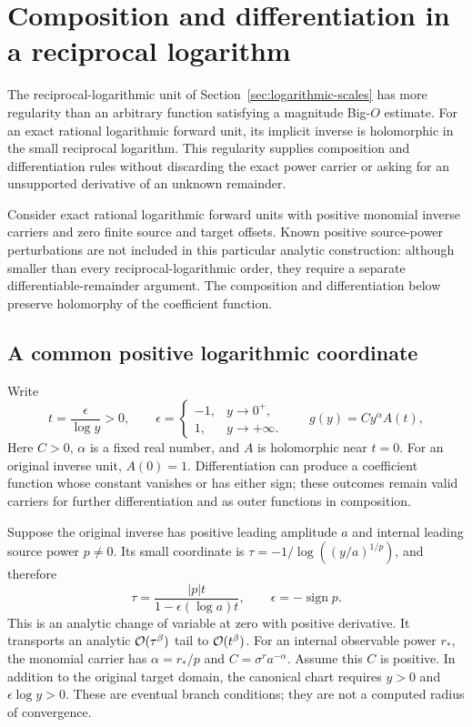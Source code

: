 \section{Composition and differentiation in a reciprocal logarithm}
\label{sec:reciprocal-log-operations}

The reciprocal-logarithmic unit of Section~\ref{sec:logarithmic-scales}
has more regularity than an arbitrary function satisfying a magnitude
Big-$O$ estimate. For an exact rational logarithmic forward unit, its
implicit inverse is holomorphic in the small reciprocal logarithm. This
regularity supplies composition and differentiation rules without
discarding the exact power carrier or asking for an unsupported derivative
of an unknown remainder.

Consider exact rational logarithmic forward units with positive monomial
inverse carriers and zero finite source and target offsets. Known positive
source-power perturbations are not included in this particular analytic
construction: although smaller than every reciprocal-logarithmic order,
they require a separate differentiable-remainder argument. The composition
and differentiation below preserve holomorphy of the coefficient function.

\subsection{A common positive logarithmic coordinate}

Write
\begin{equation}
 t=\frac{\epsilon}{\log y}>0,\qquad
 \epsilon=\begin{cases}-1,&y\to0^+,\\1,&y\to+\infty.\end{cases}
 \qquad g(y)=C y^\alpha A(t),
 \label{eq:reciprocal-calculus-carrier}
\end{equation}
Here $C>0$, $\alpha$ is a fixed real number, and $A$ is holomorphic
near $t=0$. For an original inverse unit, $A(0)=1$. Differentiation can
produce a coefficient function whose constant vanishes or has either sign;
these outcomes remain valid carriers for further differentiation and as
outer functions in composition.

Suppose the original inverse has positive leading amplitude $a$ and
internal leading source power $p\ne0$. Its small coordinate is
$\tau=-1/\log((y/a)^{1/p})$, and therefore
\begin{equation}
 \tau=\frac{|p|t}{1-\epsilon(\log a)t},\qquad
 \epsilon=-\operatorname{sign}p.
 \label{eq:reciprocal-calculus-rechart}
\end{equation}
This is an analytic change of variable at zero with positive derivative.
It transports an analytic $\mathcal O(\tau^\beta)$ tail to
$\mathcal O(t^\beta)$. For an internal observable power $r_*$, the monomial
carrier has $\alpha=r_*/p$ and $C=\sigma^r a^{-\alpha}$.
Assume this $C$ is positive. In addition to the
original target domain, the canonical chart requires $y>0$ and
$\epsilon\log y>0$. These are eventual branch conditions; they are not
a computed radius of convergence.


